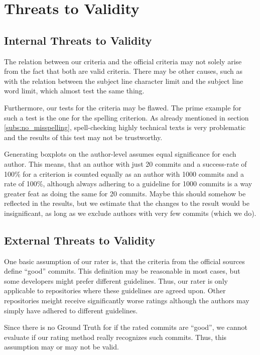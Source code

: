\section{Threats to Validity}
\label{sec:threats-to-validity}
%


\subsection{Internal Threats to Validity}
\label{sec:internal-threats}

The relation between our criteria and the official criteria may not solely arise from the fact that both are valid criteria. There may be other causes, such as with the relation between the subject line character limit and the subject line word limit, which almost test the same thing.

Furthermore, our tests for the criteria may be flawed. The prime example for such a test is the one for the spelling criterion. As already mentioned in section \ref{subs:no_misspelling}, spell-checking highly technical texts is very problematic and the results of this test may not be trustworthy.

Generating boxplots on the author-level assumes equal significance for each author. This means, that an author with just 20 commits and a success-rate of 100\% for a criterion is counted equally as an author with 1000 commits and a rate of 100\%, although always adhering to a guideline for 1000 commits is a way greater feat as doing the same for 20 commits. Maybe this should somehow be reflected in the results, but we estimate that the changes to the result would be insignificant, as long as we exclude authors with very few commits (which we do).

\subsection{External Threats to Validity}
\label{sec:external-threats}

One basic assumption of our rater is, that the criteria from the official sources define ``good'' commits. This definition may be reasonable in most cases, but some developers might prefer different guidelines. Thus, our rater is only applicable to repositories where these guidelines are agreed upon. Other repositories meight receive significantly worse ratings although the authors may simply have adhered to different guidelines.

Since there is no Ground Truth for if the rated commits are ``good'', we cannot evaluate if our rating method really recognizes such commits. Thus, this assumption may or may not be valid.
